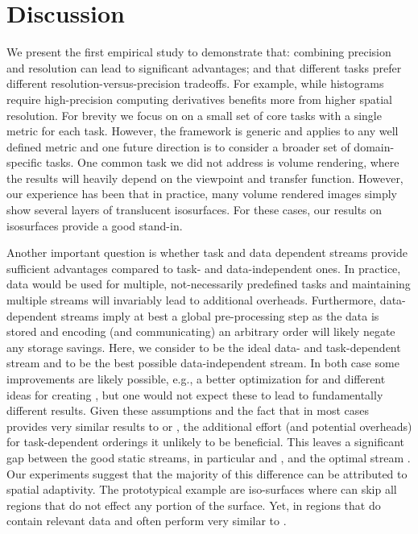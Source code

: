 \section{Discussion}

We present the first empirical study to demonstrate that: combining precision and resolution can
lead to significant advantages; and that different tasks prefer different
resolution-versus-precision tradeoffs. For example, while histograms require high-precision
computing derivatives benefits more from higher spatial resolution. For brevity we focus on on a
small set of core tasks with a single metric for each task. However, the framework is generic and
applies to any well defined metric and one future direction is to consider a broader set of
domain-specific tasks. One common task we did not address is volume rendering, where the results
will heavily depend on the viewpoint and transfer function. However, our experience has been that in
practice, many volume rendered images simply show several layers of translucent isosurfaces. For
these cases, our results on isosurfaces provide a good stand-in.

Another important question is whether task and data dependent streams provide sufficient advantages
compared to task- and data-independent ones. In practice, data would be used for multiple,
not-necessarily predefined tasks and maintaining multiple streams will invariably lead to additional
overheads. Furthermore, data-dependent streams imply at best a global pre-processing step as the
data is stored and encoding (and communicating) an arbitrary order will likely negate any storage
savings. Here, we consider \sopt to be the ideal data- and task-dependent stream and \ssig to be the
best possible data-independent stream. In both case some improvements are likely possible, e.g., a
better optimization for \sopt and different ideas for creating \ssig, but one would not expect these
to lead to fundamentally different results. Given these assumptions and the fact that \ssig in most
cases provides very similar results to \sbit or \swav, the additional effort (and potential
overheads) for task-dependent orderings it unlikely to be beneficial. This leaves a significant gap
between the good static streams, in particular \swav and \sbit, and the optimal stream \sopt. Our
experiments suggest that the majority of this difference can be attributed to spatial adaptivity.
The prototypical example are iso-surfaces where \sopt can skip all regions that do not effect any
portion of the surface. Yet, in regions that do contain relevant data \swav and \sbit often perform
very similar to \sopt.


